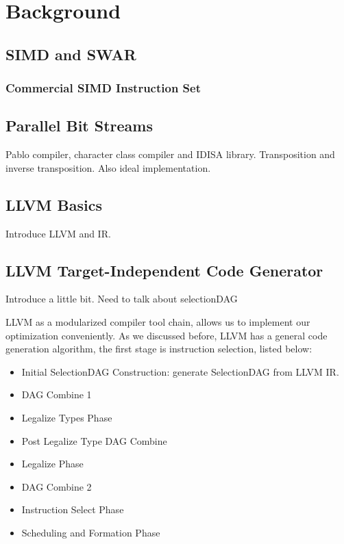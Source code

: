 %
%

\chapter{Background}
\label{two}

\section{SIMD and SWAR}
\subsection{Commercial SIMD Instruction Set}

\section{Parallel Bit Streams}
Pablo compiler, character class compiler and IDISA library. Transposition and inverse transposition. Also ideal implementation.

\section{LLVM Basics}
Introduce LLVM and IR.

\section{LLVM Target-Independent Code Generator}
Introduce a little bit.
Need to talk about selectionDAG

LLVM as a modularized compiler tool chain, allows us to implement our optimization conveniently. As we discussed before, LLVM has a general code generation algorithm, the first stage is instruction selection, listed below\cite{llvm_code_gen}:

\begin{itemize}
  \item Initial SelectionDAG Construction: generate SelectionDAG from LLVM IR.
  \item DAG Combine 1
  \item Legalize Types Phase
  \item Post Legalize Type DAG Combine
  \item Legalize Phase
  \item DAG Combine 2
  \item Instruction Select Phase
  \item Scheduling and Formation Phase
\end{itemize}

